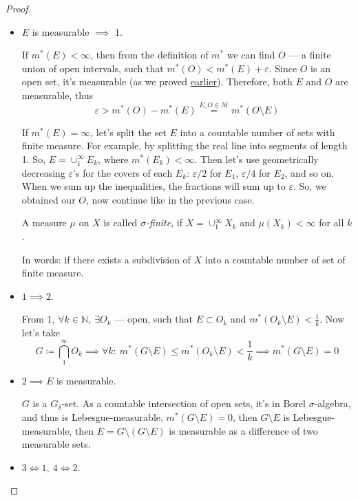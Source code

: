 \begin{proof}
    \mbox{}
    \begin{itemize}
        \item {
            $E$ is measurable $\implies$ 1.

            If $m^*(E) < \infty$, then from the definition of $m^*$
            we can find $O$ --- a finite union of open intervals, such that
            $m^*(O) < m^*(E) + \varepsilon$. Since $O$ is an open set, it's
            measurable (as we proved \hyperref[the:openMeasurable]{earlier}).
            Therefore, both $E$ and $O$ are measurable, thus
            \[ \varepsilon > m^*(O) - m^*(E) \overset{E, O \in \mathcal{M}}{=} m^*(O \setminus E) \]

            If $m^*(E) = \infty$, let's split the set $E$ into a countable number of sets with
            finite measure. For example, by splitting the real line into 
            segments of length 1. So,
            $E = \cup_1^\infty E_k$, where $m^*(E_k) < \infty$.
            Then let's use geometrically decreasing $\varepsilon$'s for the covers of each
            $E_k$: $\varepsilon / 2$ for $E_1$, $\varepsilon / 4$ for $E_2$, and so on.
            When we sum up the inequalities, the fractions will sum up to $\varepsilon$.
            So, we obtained our $O$, now continue like in the previous case.
            \begin{definition}
                A measure $\mu$ on $X$ is called 
                \textit{$\sigma$-finite}, if $X = \cup_1^\infty X_k$ and
                $\mu(X_k) < \infty$ for all $k$. 
                
                In words:
                if there exists a subdivision of $X$ into a countable number
                of set of finite measure.
            \end{definition}
        }
        \item {
            $1 \implies 2$.

            From $1$, $\forall k \in \mathbb{N},\ \exists O_k$ ---
            open, such that $E \subset O_k$ and
            $m^*(O_k \setminus E) < \frac{1}{k}$.
            Now let's take
            \[
                G \coloneqq \bigcap_1^\infty O_k \implies
                \forall k:\ m^*(G \setminus E) \le m^*(O_k \setminus E) < \frac{1}{k}
                \implies m^*(G \setminus E) = 0
            \]
        }
        \item {
            $2 \implies E$ is measurable.

            $G$ is a $G_\delta$-set. As a countable intersection of open sets,
            it's in Borel $\sigma$-algebra, and thus is Lebesgue-measurable.
            $m^*(G \setminus E) = 0$, then $G \setminus E$ is Lebesgue-measurable,
            then $E = G \setminus (G \setminus E)$ is measurable as
            a difference of two measurable sets.
        }
        \item {
            $3 \Longleftrightarrow 1,\ 4 \Longleftrightarrow 2$.

}
\end{itemize}
\end{proof}
